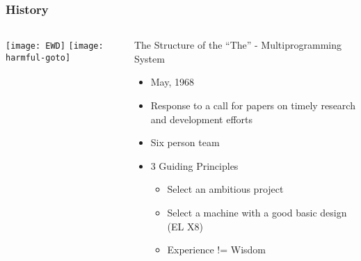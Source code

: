 \begin{frame}[plain]
	\frametitle{History}
	
	
	
	\begin{columns}

		\begin{column}{.4\textwidth}
			\centering
			\texttt{[image: EWD]}
			\texttt{[image: harmful-goto]}
			
			
			
		\end{column}
		
		\begin{column}{.6\textwidth}
			
			The Structure of the “The” - Multiprogramming System
			\begin{itemize}
				\item May, 1968
				
				\item  Response to a call for papers on timely research and development efforts
				
				\item  Six person team

				\item  3 Guiding Principles
					\begin{itemize}
					\item Select an ambitious project
					\item Select a machine with a good basic design (EL X8)
					\item Experience != Wisdom
					\end{itemize}
					
				\end{itemize}	
					
			\end{column}

	\end{columns}


\end{frame}

